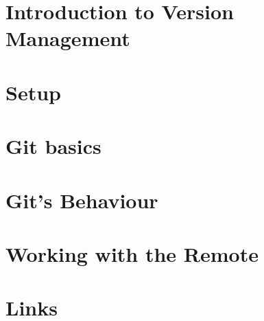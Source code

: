 \documentclass[b5paper,openany]{book}
\begin{document}
\tp


\tableofcontents



\chapter{Introduction to Version Management}


\chapter{Setup}


\chapter{Git basics}


\chapter{Git's Behaviour}


\chapter{Working with the Remote}


\chapter{Links}





\end{document}
